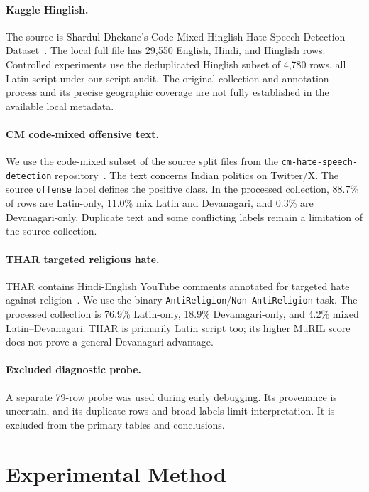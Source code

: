 \documentclass[11pt,a4paper]{article}
\begin{document}
\paragraph{Kaggle Hinglish.}
The source is Shardul Dhekane's Code-Mixed Hinglish Hate Speech Detection
Dataset~\cite{dhekane2024kaggle}. The local full file has 29,550 English,
Hindi, and Hinglish rows. Controlled experiments use the deduplicated
Hinglish subset of 4,780 rows, all Latin script under our script audit.
The original collection and annotation process and its precise geographic
coverage are not fully established in the available local metadata.

\paragraph{CM code-mixed offensive text.}
We use the code-mixed subset of the source split files from the
\texttt{cm-hate-speech-detection} repository~\cite{cmrepo2024}. The text
concerns Indian politics on Twitter/X. The source \texttt{offense} label
defines the positive class. In the processed collection, 88.7\% of rows
are Latin-only, 11.0\% mix Latin and Devanagari, and 0.3\% are
Devanagari-only. Duplicate text and some conflicting labels remain a
limitation of the source collection.

\paragraph{THAR targeted religious hate.}
THAR contains Hindi-English YouTube comments annotated for targeted hate
against religion~\cite{sharma2024thar,tharrepo2024}. We use the binary
\texttt{AntiReligion}/\texttt{Non-AntiReligion} task. The processed
collection is 76.9\% Latin-only, 18.9\% Devanagari-only, and 4.2\%
mixed Latin--Devanagari. THAR is primarily Latin script too; its higher
MuRIL score does not prove a general Devanagari advantage.

\paragraph{Excluded diagnostic probe.}
A separate 79-row probe was used during early debugging. Its provenance
is uncertain, and its duplicate rows and broad labels limit interpretation.
It is excluded from the primary tables and conclusions.

\section{Experimental Method}
\end{document}

